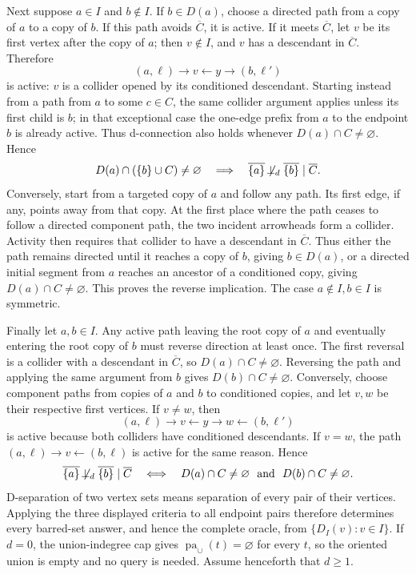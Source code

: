 Next suppose \(a\in I\) and \(b\notin I\). If \(b\in D(a)\), choose a directed path from a copy of \(a\) to a copy of \(b\). If this path avoids \(\overline C\), it is active. If it meets \(\overline C\), let \(v\) be its first vertex after the copy of \(a\); then \(v\notin I\), and \(v\) has a descendant in \(\overline C\). Therefore
\[
 (a,\ell)\to v\leftarrow y\to(b,\ell')
\]
is active: \(v\) is a collider opened by its conditioned descendant. Starting instead from a path from \(a\) to some \(c\in C\), the same collider argument applies unless its first child is \(b\); in that exceptional case the one-edge prefix from \(a\) to the endpoint \(b\) is already active. Thus d-connection also holds whenever \(D(a)\cap C\ne\varnothing\). Hence
\[
 D(a)\cap(\{b\}\cup C)\ne\varnothing
 \quad\Longrightarrow\quad
 \overline{\{a\}}\not\!\perp_d\overline{\{b\}}\mid\overline C.
\]
Conversely, start from a targeted copy of \(a\) and follow any path. Its first edge, if any, points away from that copy. At the first place where the path ceases to follow a directed component path, the two incident arrowheads form a collider. Activity then requires that collider to have a descendant in \(\overline C\). Thus either the path remains directed until it reaches a copy of \(b\), giving \(b\in D(a)\), or a directed initial segment from \(a\) reaches an ancestor of a conditioned copy, giving \(D(a)\cap C\ne\varnothing\). This proves the reverse implication. The case \(a\notin I,b\in I\) is symmetric.

Finally let \(a,b\in I\). Any active path leaving the root copy of \(a\) and eventually entering the root copy of \(b\) must reverse direction at least once. The first reversal is a collider with a descendant in \(\overline C\), so \(D(a)\cap C\ne\varnothing\). Reversing the path and applying the same argument from \(b\) gives \(D(b)\cap C\ne\varnothing\). Conversely, choose component paths from copies of \(a\) and \(b\) to conditioned copies, and let \(v,w\) be their respective first vertices. If \(v\ne w\), then
\[
 (a,\ell)\to v\leftarrow y\to w\leftarrow(b,\ell')
\]
is active because both colliders have conditioned descendants. If \(v=w\), the path \((a,\ell)\to v\leftarrow(b,\ell)\) is active for the same reason. Hence
\[
 \overline{\{a\}}\not\!\perp_d\overline{\{b\}}\mid\overline C
 \quad\Longleftrightarrow\quad
 D(a)\cap C\ne\varnothing\ \text{ and }\ D(b)\cap C\ne\varnothing.
\]
D-separation of two vertex sets means separation of every pair of their vertices. Applying the three displayed criteria to all endpoint pairs therefore determines every barred-set answer, and hence the complete oracle, from \(\{D_I(v):v\in I\}\).
If \(d=0\), the union-indegree cap gives \(\operatorname{pa}_{\cup}(t)=\varnothing\) for every \(t\), so the oriented union is empty and no query is needed. Assume henceforth that \(d\ge1\).

